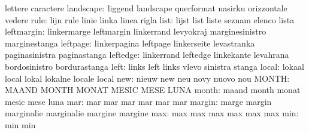                            lettere                   caractere
                landscape: liggend                   landscape
                           querformat                nasirku
                           orizzontale               vedere
                     rule: lijn                      rule
                           linie                     linka
                           linea                     rigla
                     list: lijst                     list
                           liste                     seznam
                           elenco                    lista
               leftmargin: linkermarge               leftmargin
                           linkerrand                levyokraj
                           marginesinistro           marginestanga
                 leftpage: linkerpagina              leftpage
                           linkerseite               levastranka
                           paginasinistra            paginastanga
                 leftedge: linkerrand                leftedge
                           linkekante                levahrana
                           bordosinistro             bordurastanga
                     left: links                     left
                           links                     vlevo
                           sinistra                  stanga
                    local: lokaal                    local
                           lokal                     lokalne
                           locale                    local
                      new: nieuw                     new
                           neu                       novy
                           nuovo                     nou
                    MONTH: MAAND                     MONTH
                           MONAT                     MESIC
                           MESE                      LUNA
                    month: maand                     month
                           monat                     mesic
                           mese                      luna
                      mar: mar                       mar
                           mar                       mar
                           mar                       mar
                   margin: marge                     margin
                           marginalie                marginalie
                           margine                   margine
                      max: max                       max
                           max                       max
                           max                       max
                      min: min                       min
